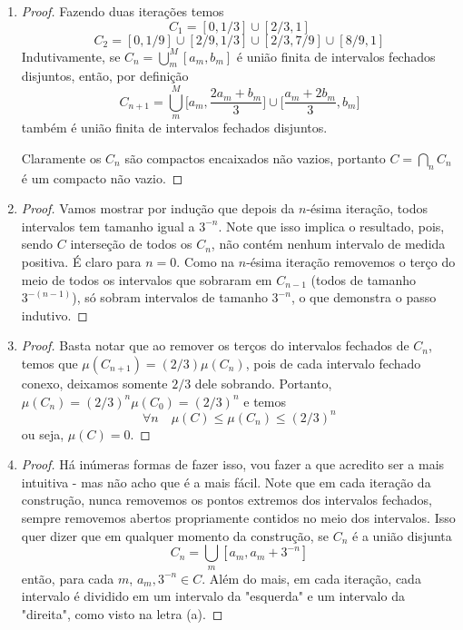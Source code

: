 \begin{problem}
    \label{prob:l4:5}
\end{problem}
\begin{enumerate}[label=(\alph*)]
    \item \begin{proof}
        Fazendo duas iterações temos 
        $$C_1 = [0,1/3] \cup [2/3, 1]$$
        $$C_2 = [0,1/9] \cup [2/9, 1/3] \cup [2/3,7/9] \cup [8/9,1]$$
        Indutivamente, se $C_n = \bigcup_m^{M} [a_m, b_m]$ é união finita de intervalos fechados
        disjuntos, então, por definição
        $$C_{n+1} = \bigcup_m^{M} \bigg[a_m, \frac{2a_m + b_m}{3}\bigg] \cup \bigg[ \frac{a_m + 2b_m}{3}, b_m \bigg]$$
        também é união finita de intervalos fechados disjuntos.

        Claramente os $C_n$ são compactos encaixados não vazios, portanto $C = \bigcap_n C_n$ é um compacto não vazio. 
    \end{proof}

    \item \begin{proof}
        Vamos mostrar por indução que depois da $n$-ésima iteração, todos intervalos tem tamanho igual a $3^{-n}$. Note que isso 
        implica o resultado, pois, sendo $C$ interseção de todos os $C_n$, não contém nenhum intervalo de medida positiva.
        É claro para $n = 0$. Como na $n$-ésima iteração removemos 
        o terço do meio de todos os intervalos que sobraram em $C_{n-1}$ (todos de tamanho $3^{-(n-1)}$), só 
        sobram intervalos de tamanho $3^{-n}$, o que demonstra o passo indutivo. 
    \end{proof}

    \item \begin{proof}
        Basta notar que ao remover os terços do intervalos fechados de $C_n$, temos que $\mu(C_{n+1}) = (2/3)\mu(C_n)$, 
        pois de cada intervalo fechado conexo, deixamos somente $2/3$ dele sobrando.
        Portanto, $\mu(C_n) = (2/3)^n \mu(C_0) = (2/3)^n$ e temos 
        $$\forall n \quad \mu(C) \leq \mu(C_n) \leq (2/3)^n$$
        ou seja, $\mu(C) = 0$.
    \end{proof}

    \item \begin{proof}
        Há inúmeras formas de fazer isso, vou fazer a que acredito ser a mais intuitiva - mas não acho que é a mais fácil.
        Note que em cada iteração da construção, nunca removemos os pontos extremos dos intervalos fechados,
        sempre removemos abertos propriamente contidos no meio dos intervalos. Isso quer dizer 
        que em qualquer momento da construção, se $C_n$ é a união disjunta
        $$C_n = \bigcup_m [a_m, a_m + 3^{-n}]$$
        então, para cada $m$, $a_m, 3^{-n} \in C$. Além do mais, em cada iteração, cada intervalo é dividido 
        em um intervalo da "esquerda" e um intervalo da "direita", como visto na letra (a).
        

\end{proof}
\end{enumerate}
